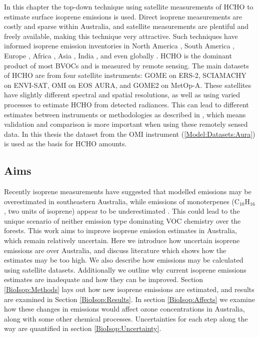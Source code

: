   In this chapter the top-down technique using satellite measurements of HCHO to estimate surface isoprene emissions is used.
  Direct isoprene measurements are costly and sparse within Australia, and satellite measurements are plentiful and freely available, making this technique very attractive.
  Such techniques have informed isoprene emission inventories in North America \parencite{Abbot2003,Palmer2003,Palmer2006,Millet2006,Millet2008}, South America \parencite{Barkley2013}, Europe \parencite{Dufour2009,Curci2010}, Africa \parencite{Marais2012}, Asia \parencite{Fu2007,Stavrakou2014}, India \parencite{Surl2018}, and even globally \parencite{Shim2005,FortemsCheiney2012,Bauwens2016}.
  HCHO is the dominant product of most BVOCs and is measured by remote sensing.
  The main datasets of HCHO are from four satellite instruments: GOME on ERS-2, SCIAMACHY on ENVI-SAT, OMI on EOS AURA, and GOME2 on MetOp-A.
  These satellites have slightly different spectral and spatial resolutions, as well as using varied processes to estimate HCHO from detected radiances.
  This can lead to different estimates between instruments or methodologies as described in \textcite{Lorente2017}, which means validation and comparison is more important when using these remotely sensed data.
  In this thesis the dataset from the OMI instrument (\ref{Model:Datasets:Aura}) is used as the basis for HCHO amounts.
  
  \subsection{Aims}
    
    Recently isoprene measurements have suggested that modelled emissions may be overestimated in southeastern Australia, while
    emissions of monoterpenes (C$_{10}$H$_{16}$, two units of isoprene) appear to be underestimated \parencite{Emmerson2016}. 
    This could lead to the unique scenario of neither emission type dominating VOC chemistry over the forests.
    This work aims to improve isoprene emission estimates in Australia, which remain relatively uncertain.
    Here we introduce how uncertain isoprene emissions are over Australia, and discuss literature which shows how the estimates may be too high.
    We also describe how emissions may be calculated using satellite datasets.
    Additionally we outline why current isoprene emissions estimates are inadequate and how they can be improved.
    Section \ref{BioIsop:Methods} lays out how new isoprene emissions are estimated, and results are examined in Section \ref{BioIsop:Results}. 
    In section \ref{BioIsop:Affects} we examine how these changes in emissions would affect ozone concentrations in Australia, along with some other chemical processes.
    Uncertainties for each step along the way are quantified in section \ref{BioIsop:Uncertainty}.
  
